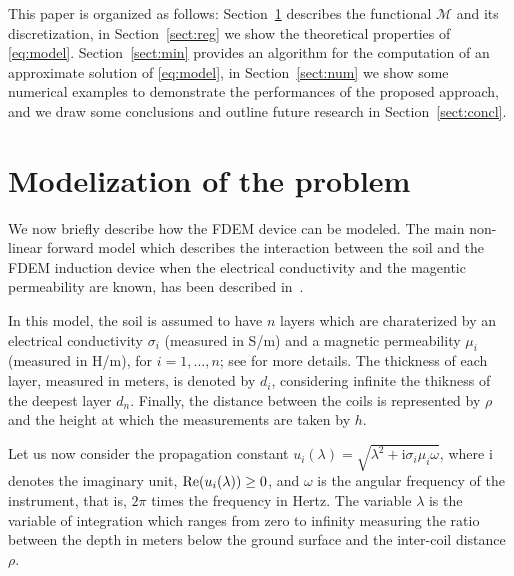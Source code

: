 \documentclass[final,leqno]{siamltex}
\newcommand{\ii}{{\mathrm{i}}}
\begin{document}
This paper is organized as follows: Section~\ref{sect:model} describes the functional $\mathcal{M}$ and its discretization, in Section~\ref{sect:reg} we show the theoretical properties of \eqref{eq:model}. Section~\ref{sect:min} provides an algorithm for the computation of an approximate solution of \eqref{eq:model}, in Section~\ref{sect:num} we show some numerical examples to demonstrate the performances of the proposed approach, and we draw some conclusions and outline future research in Section~\ref{sect:concl}.

\section{Modelization of the problem}\label{sect:model}
We now briefly describe how the FDEM device can be modeled. The main non-linear forward model which describes the interaction between the soil and the FDEM induction device when the electrical conductivity and the magentic permeability are known, has been described in~\cite{hendr02}.

In this model, the soil is assumed to have $n$ layers which are charaterized by an electrical conductivity $\sigma_i$ (measured in S/m) and a magnetic permeability $\mu_i$ (measured in H/m), for $i=1,\ldots,n$; see \cite{dfr14,ddr17} for more details. The thickness of each layer, measured in meters, is denoted by $d_i$, considering infinite the thikness of the deepest layer $d_n$. Finally, the distance between the coils is represented by $\rho$ and the height at which the measurements are taken by $h$.

Let  us now consider the propagation constant $u_i(\lambda) = \sqrt{\lambda^2 + \ii\sigma_i\mu_i\omega}$, where $\ii$ denotes the imaginary unit, ${\rm Re}(u_i(\lambda))\geq0$, and $\omega$ is the angular frequency of the instrument, that is, $2\pi$ times the frequency in Hertz. The variable $\lambda$ is the variable of integration which ranges from zero to infinity measuring the ratio between the depth in meters below the ground surface and the inter-coil distance $\rho$.
\end{document}
